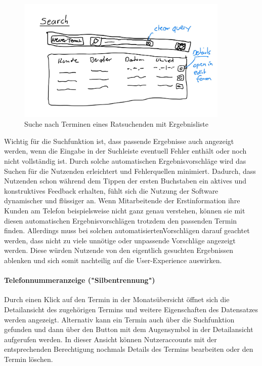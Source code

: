 \documentclass[12pt]{article}
\begin{document}
\begin{figure}[h]
    \caption{Suche nach Terminen eines Ratsuchenden mit Ergebnisliste}
    \centering
    \includegraphics[width=0.9\textwidth]{doodle_search_view.jpeg}
\end{figure}

Wichtig für die Suchfunktion ist, dass passende Ergebnisse auch angezeigt
werden, wenn die Eingabe in der Suchleiste eventuell Fehler enthält oder noch
nicht vollständig ist. Durch solche automatischen Ergebnisvorschläge wird das
Suchen für die Nutzenden erleichtert und Fehlerquellen minimiert. Dadurch, dass
Nutzenden schon während dem Tippen der ersten Buchstaben ein aktives und
konstruktives Feedback erhalten, fühlt sich die Nutzung der Software
dynamischer und flüssiger an. \cite{autoCompletion} Wenn Mitarbeitende der
Erstinformation ihre Kunden am Telefon beispielsweise nicht ganz genau
verstehen, können sie mit diesen automatischen Ergebnisvorschlägen trotzdem den
passenden Termin finden. Allerdings muss bei solchen automatisiertenVorschlägen
darauf geachtet werden, dass nicht zu viele unnötige oder unpassende Vorschläge
angezeigt werden. Diese würden Nutzende von den eigentlich gesuchten
Ergebnissen ablenken und sich somit nachteilig auf die User-Experience
auswirken. \cite{autosuggModeration}

\paragraph{Telefonnummeranzeige ("Silbentrennung")}

Durch einen Klick auf den Termin in der Monatsübersicht öffnet sich die
Detailansicht des zugehörigen Termins und weitere Eigenschaften des Datensatzes
werden angezeigt. Alternativ kann ein Termin auch über die Suchfunktion
gefunden und dann über den Button mit dem Augensymbol in der Detailansicht
aufgerufen werden. In dieser Ansicht können Nutzeraccounts mit der
entsprechenden Berechtigung nochmals Details des Termins bearbeiten oder den
Termin löschen.
\end{document}
